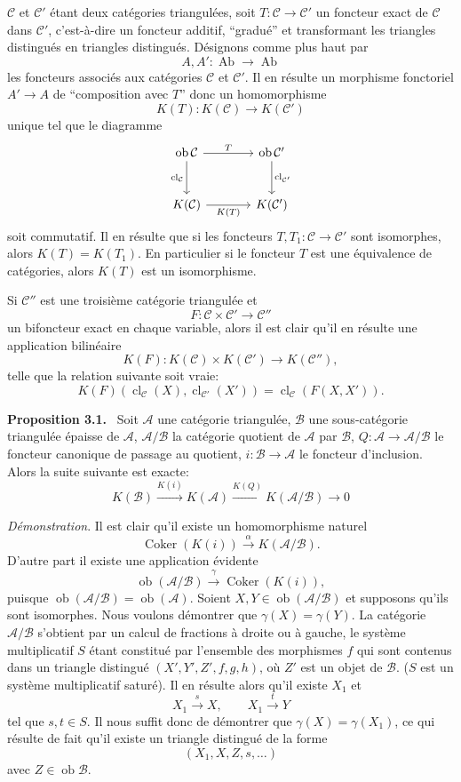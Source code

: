 \documentclass[11pt]{article}
\newenvironment{statement}[1]{\par\medskip\noindent\textbf{#1.}\ }{\par\medskip}
\providecommand{\Ob}{\operatorname{ob}}
\providecommand{\cC}{\mathcal C}
\providecommand{\Ob}{\operatorname{ob}}
\providecommand{\Ab}{\operatorname{Ab}}
\providecommand{\cC}{\mathcal C}
\providecommand{\cA}{\mathcal A}
\providecommand{\cB}{\mathcal B}
\providecommand{\Ab}{\operatorname{Ab}}
\providecommand{\Ob}{\operatorname{Ob}}
\providecommand{\Ob}{\operatorname{ob}}
\providecommand{\Ob}{\operatorname{Ob}}
\begin{document}
$\cC$ et $\cC'$ étant deux catégories triangulées, soit $T:\cC\to\cC'$ un foncteur exact de $\cC$ dans $\cC'$, c'est-à-dire un foncteur additif, ``gradué'' et transformant les triangles
distingués en triangles distingués. Désignons comme plus haut par
\[
A,A':\Ab\longrightarrow\Ab
\]
les foncteurs associés aux catégories $\cC$ et $\cC'$. Il en résulte un morphisme fonctoriel $A'\to A$ de ``composition avec $T$'' donc un homomorphisme
\[
K(T):K(\cC)\longrightarrow K(\cC')
\]
unique tel que le diagramme
\[
\begin{tikzcd}[column sep=large,row sep=large]
\Ob\cC \arrow[r,"T"] \arrow[d,"\operatorname{cl}_{\cC}"']&
\Ob\cC' \arrow[d,"\operatorname{cl}_{\cC'}"]\\
K(\cC) \arrow[r,"K(T)"']& K(\cC')
\end{tikzcd}
\]
soit commutatif. Il en résulte que si les foncteurs $T,T_1:\cC\to\cC'$ sont isomorphes, alors $K(T)=K(T_1)$. En particulier si le foncteur $T$ est une équivalence de catégories, alors $K(T)$ est un isomorphisme.

Si $\cC''$ est une troisième catégorie triangulée et
\[
F:\cC\times\cC'\longrightarrow \cC''
\]
un bifoncteur exact en chaque variable, alors il est clair qu'il en résulte une application bilinéaire
\[
K(F):K(\cC)\times K(\cC')\longrightarrow K(\cC''),
\]
telle que la relation suivante soit vraie:
\[
K(F)(\operatorname{cl}_{\cC}(X),\operatorname{cl}_{\cC'}(X'))
=
\operatorname{cl}_{\cC}(F(X,X')).
\]

\begin{statement}{Proposition 3.1}
Soit $\cA$ une catégorie triangulée, $\cB$ une sous-catégorie triangulée épaisse de $\cA$, $\cA/\cB$ la catégorie quotient de $\cA$ par $\cB$, $Q:\cA\to\cA/\cB$ le foncteur canonique de passage au quotient, $i:\cB\to\cA$ le foncteur d'inclusion. Alors la suite suivante est exacte:
\[
K(\cB)\xrightarrow{K(i)}K(\cA)\xrightarrow{K(Q)}K(\cA/\cB)\longrightarrow 0
\]
\end{statement}

\emph{Démonstration}. Il est clair qu'il existe un homomorphisme naturel
\[
\operatorname{Coker}(K(i))\xrightarrow{\alpha}K(\cA/\cB).
\]
D'autre part il existe une application évidente
\[
\Ob(\cA/\cB)\xrightarrow{\gamma}\operatorname{Coker}(K(i)),
\]
puisque $\Ob(\cA/\cB)=\Ob(\cA)$. Soient $X,Y\in\Ob(\cA/\cB)$ et supposons qu'ils sont isomorphes. Nous voulons démontrer que $\gamma(X)=\gamma(Y)$. La catégorie $\cA/\cB$ s'obtient par un calcul de fractions à droite ou à gauche, le système multiplicatif $S$ étant constitué par l'ensemble des morphismes $f$ qui sont contenus dans un triangle distingué $(X',Y',Z',f,g,h)$, où $Z'$ est un objet de $\cB$. ($S$ est un système multiplicatif saturé). Il en résulte alors qu'il existe $X_1$ et
\[
X_1\xrightarrow{s}X,\qquad X_1\xrightarrow{t}Y
\]
tel que $s,t\in S$. Il nous suffit donc de démontrer que $\gamma(X)=\gamma(X_1)$, ce qui résulte de fait qu'il existe un triangle distingué de la forme
\[
(X_1,X,Z,s,\ldots)
\]
avec $Z\in\Ob\cB$.
\end{document}
